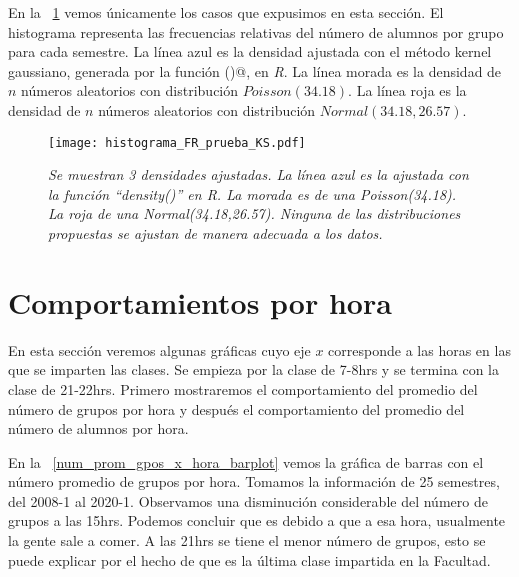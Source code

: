En la \figurename{~\ref{histFR_pruebaKS}} vemos únicamente los casos que expusimos en esta sección. El histograma representa las frecuencias relativas del número de alumnos por grupo para cada semestre. La línea azul es la densidad ajustada con el método kernel gaussiano, generada por la función \verb@density()@, en \textit{R}. La línea morada es la densidad de $n$ números aleatorios con distribución $Poisson(34.18)$. La línea roja es la densidad de $n$ números aleatorios con distribución  $Normal(34.18,26.57)$.


\begin{figure}[H]
\centering
\texttt{[image: histograma\_FR\_prueba\_KS.pdf]} %
\caption[\textit{Histograma con densidades ajustadas}]{\textit{Se muestran 3 densidades ajustadas. La línea azul es la ajustada con la función ``density()'' en R. La morada es de una Poisson(34.18). La roja de una Normal(34.18,26.57). Ninguna de las distribuciones propuestas se ajustan de manera adecuada a los datos.}}\label{histFR_pruebaKS}
\end{figure}



\section{Comportamientos por hora}

En esta sección veremos algunas gráficas cuyo eje $x$ corresponde a las horas en las que se imparten las clases. Se empieza por la clase de 7-8hrs y se termina con la clase de 21-22hrs. Primero mostraremos el comportamiento del promedio del número de grupos por hora y después el comportamiento del promedio del número de alumnos por hora.

En la \figurename{~\ref{num_prom_gpos_x_hora_barplot}} vemos la gráfica de barras con el número promedio de grupos por hora. Tomamos la información de 25 semestres, del 2008-1 al 2020-1. Observamos una disminución considerable del número de grupos a las 15hrs. Podemos concluir que es debido a que a esa hora, usualmente la gente sale a comer. A las 21hrs se tiene el menor número de grupos, esto se puede explicar por el hecho de que es la última clase impartida en la Facultad.

